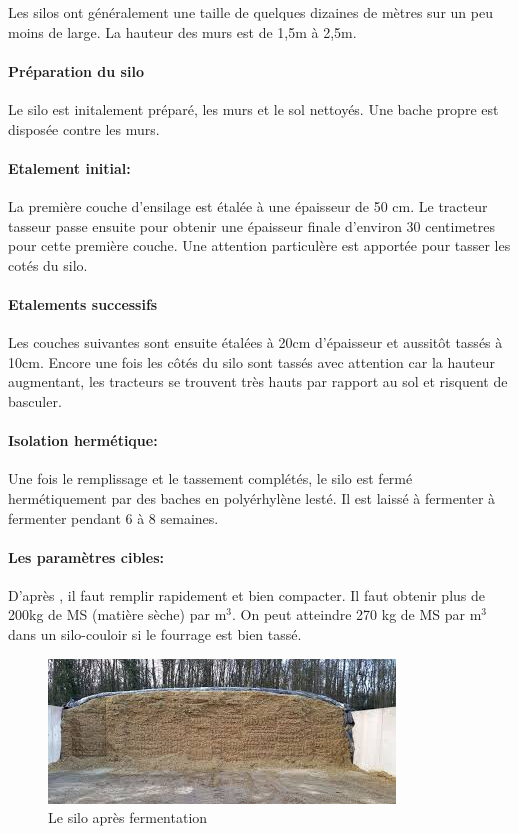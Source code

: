 \documentclass[12pt,a4paper]{report}
\begin{document}
Les silos ont généralement une taille de quelques dizaines de mètres sur un peu moins de large. La hauteur des murs est de 1,5m à 2,5m.

\paragraph{Préparation du silo} Le silo est initalement préparé, les murs et le sol nettoyés. Une bache propre est disposée contre les murs.

\paragraph{Etalement initial:} La première couche d'ensilage est étalée à une épaisseur de 50 cm. Le tracteur tasseur passe ensuite pour obtenir une épaisseur finale d'environ 30 centimetres pour cette première couche. Une attention particulère est apportée pour tasser les cotés du silo.

\paragraph{Etalements successifs} Les couches suivantes sont ensuite étalées à 20cm d'épaisseur et aussitôt tassés à 10cm. Encore une fois les côtés du silo sont tassés avec attention car la hauteur augmentant, les tracteurs se trouvent très hauts par rapport au sol et risquent de basculer.

\paragraph{Isolation hermétique:} Une fois le remplissage et le tassement complétés, le silo est fermé hermétiquement par des baches en polyérhylène lesté. Il est laissé à fermenter à fermenter pendant 6 à 8 semaines.

\paragraph{Les paramètres cibles: } D'après \cite{trachsler_planifier_nodate}, il faut remplir rapidement et bien compacter. Il faut obtenir plus de 200kg de MS (matière sèche) par m$^3$. On peut atteindre 270 kg de MS par m$^3$ dans un silo-couloir si le fourrage est bien tassé.


\begin{figure}[H]
	\centering
	\includegraphics[width=0.7\linewidth]{img/porduitfinal}
	\caption{Le silo après fermentation}
	\label{fig:porduitfinal}
\end{figure}
\end{document}
